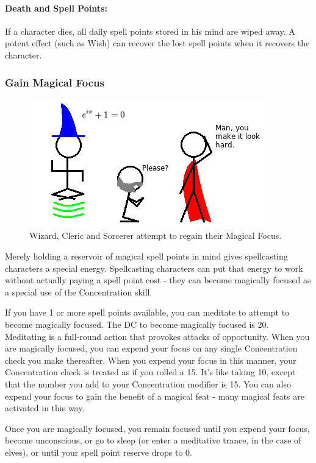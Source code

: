\paragraph{Death and Spell Points:} If a character dies, all daily spell points stored in his mind are wiped away. 
A potent effect (such as Wish) can recover the lost spell points when it recovers the character.
\subsubsection[Magical Focus]{Gain Magical Focus}

\begin{figure}
  \caption{Wizard, Cleric and Sorcerer attempt to regain their Magical Focus.}
  \centering
    \includegraphics{Pics/SpellPoints.png}
\end{figure}

\label{sec:MagicFocus}
Merely holding a reservoir of magical spell points in mind gives spellcasting characters a special energy. 
Spellcasting characters can put that energy to work without actually paying a spell point cost - 
they can become magically focused as a special use of the Concentration skill.

If you have 1 or more spell points available, you can meditate to attempt to become magically focused. 
The DC to become magically focused is 20. Meditating is a full-round action that provokes attacks of opportunity. 
When you are magically focused, you can expend your focus on any single Concentration check you make thereafter. 
When you expend your focus in this manner, your Concentration check is treated as if you rolled a 15. 
It's like taking 10, except that the number you add to your Concentration modifier is 15. 
You can also expend your focus to gain the benefit of a magical feat - many magical feats are activated in this way.

Once you are magically focused, you remain focused until you expend your focus, become unconscious, 
or go to sleep (or enter a meditative trance, in the case of elves), or until your spell point reserve drops to 0.
